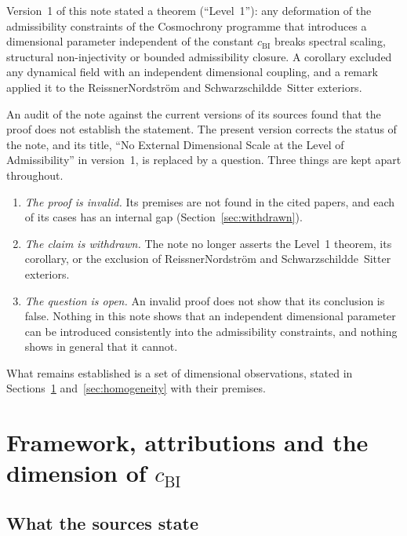 \documentclass[11pt,a4paper]{article}
\begin{document}
    Version~1 of this note stated a theorem (``Level~1''): any deformation of the admissibility constraints of
    the Cosmochrony programme that introduces a dimensional parameter independent of the constant
    $c_{\mathrm{BI}}$ breaks spectral scaling, structural non-injectivity or bounded admissibility closure.
    A corollary excluded any dynamical field with an independent dimensional coupling, and a remark applied it to
    the Reissner\textendash Nordstr\"om and Schwarzschild\textendash de~Sitter exteriors.

    An audit of the note against the current versions of its sources found that the proof does not establish
    the statement.
    The present version corrects the status of the note, and its title, ``No External Dimensional Scale at the
    Level of Admissibility'' in version~1, is replaced by a question.
    Three things are kept apart throughout.
    \begin{enumerate}[(1)]
      \item \emph{The proof is invalid.}
        Its premises are not found in the cited papers, and each of its cases has an internal gap
        (Section~\ref{sec:withdrawn}).
      \item \emph{The claim is withdrawn.}
        The note no longer asserts the Level~1 theorem, its corollary, or the exclusion of
        Reissner\textendash Nordstr\"om and Schwarzschild\textendash de~Sitter exteriors.
      \item \emph{The question is open.}
        An invalid proof does not show that its conclusion is false.
        Nothing in this note shows that an independent dimensional parameter can be introduced consistently into
        the admissibility constraints, and nothing shows in general that it cannot.
    \end{enumerate}
    What remains established is a set of dimensional observations, stated in
    Sections~\ref{sec:framework} and~\ref{sec:homogeneity} with their premises.

  \section{Framework, attributions and the dimension of \texorpdfstring{$c_{\mathrm{BI}}$}{c\_BI}}
  \label{sec:framework}

  \subsection{What the sources state}
\end{document}
